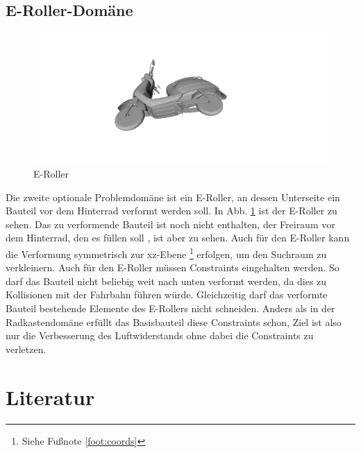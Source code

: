 \documentclass[12pt]{article}
\begin{document}
\subsection{E-Roller-Domäne}
\begin{figure}
	\includegraphics[width=\linewidth]{escooter}
	\caption{E-Roller}
	\label{fig:escooter}
\end{figure}

Die zweite optionale Problemdomäne ist ein E-Roller, an dessen Unterseite ein Bauteil vor dem Hinterrad verformt werden soll.
In Abb. \ref{fig:escooter} ist der E-Roller zu sehen. Das zu verformende Bauteil ist noch nicht enthalten, der Freiraum vor dem Hinterrad, den es füllen soll , ist aber zu sehen.
Auch für den E-Roller kann die Verformung symmetrisch zur xz-Ebene \footnote{Siehe Fußnote \ref{foot:coords}} erfolgen, um den Suchraum zu verkleinern.
Auch für den E-Roller müssen Constraints eingehalten werden.
So darf das Bauteil nicht beliebig weit nach unten verformt werden, da dies zu Kollisionen mit der Fahrbahn führen würde.
Gleichzeitig darf das verformte Bauteil bestehende Elemente des E-Rollers nicht schneiden.
Anders als in der Radkastendomäne erfüllt das Basisbauteil diese Constraints schon, Ziel ist also nur die Verbesserung des Luftwiderstands ohne dabei die Constraints zu verletzen.
 
\section{Literatur}
\end{document}
